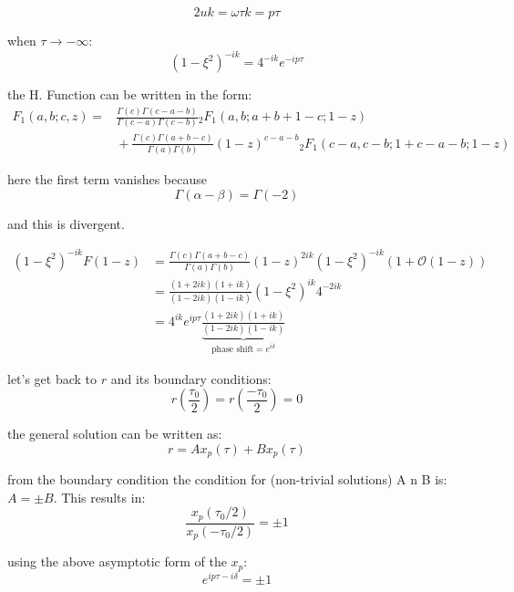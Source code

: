 \documentclass[12pt,a4paper]{article}
\numberwithin{equation}{section}
\begin{document}
\begin{equation}
2 u k = \omega \tau k = p\tau
\end{equation}

when $\tau \rightarrow -\infty$:
\begin{equation}
(1-\xi^2)^{-ik} = 4^{-ik} e^{-ip\tau}
\end{equation}

the H. Function can be written in the form:
\begin{align}
F_{1}(a,b;c,z)={}&{\frac {\Gamma (c)\Gamma (c-a-b)}{\Gamma (c-a)\Gamma (c-b)}}{}_{2}F_{1}(a,b;a+b+1-c;1-z)\\
&{}+{\frac {\Gamma (c)\Gamma (a+b-c)}{\Gamma (a)\Gamma (b)}}(1-z)^{c-a-b}{}_{2}F_{1}(c-a,c-b;1+c-a-b;1-z)
\end{align}


here the first term vanishes because
\begin{equation}
\Gamma (\alpha - \beta) = \Gamma (-2) 
\end{equation}

and this is divergent.

\begin{align}
(1-\xi^2)^{-ik} F(1-z) &= \frac {\Gamma (c)\Gamma (a+b-c)}{\Gamma (a)\Gamma (b)}(1-z)^{2ik} (1-\xi^2)^{-ik} (1+\mathcal{O}(1-z)) \\
&= \frac{(1+2ik)(1+ik)}{(1-2ik)(1-ik)} (1-\xi^2)^{ik} 4^{-2ik} \\
&= 4^{ik} e^{ip\tau} \underbrace{\frac{(1+2ik)(1+ik)}{(1-2ik)(1-ik)}}_{\text{phase shift} = e^{i\delta}}
\end{align}

let's get back to $r$ and its boundary conditions:
\begin{equation}
r(\frac{\tau_0}{2}) = r(\frac{-\tau_0}{2}) = 0
\end{equation}

the general solution can be written as:
\begin{equation}
r = Ax_p(\tau) + Bx_p(\tau)
\end{equation}

from the boundary condition the condition for (non-trivial solutions) A n B is: $A = \pm B$. This results in:
\begin{equation}
\frac{x_p(\tau_0 /2)}{x_p(-\tau_0 /2 )} = \pm 1
\end{equation}

using the above asymptotic form of the $x_p$:
\begin{equation}
e^{ip\tau - i\delta} = \pm 1
\end{equation} 
\end{document}
